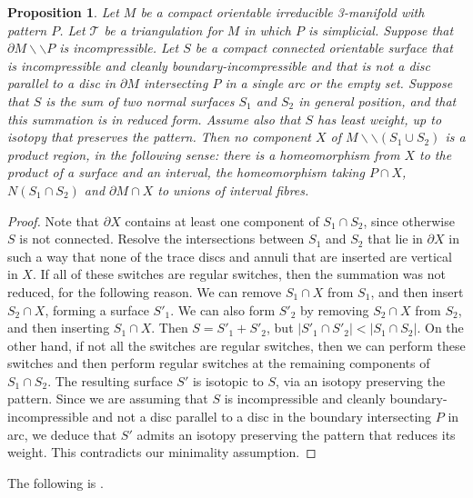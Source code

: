 \documentclass[oneside]{amsart}
\numberwithin{equation}{section}
\theoremstyle{plain}
\newtheorem{proposition}[equation]{Proposition}
\theoremstyle{definition}
\newcommand{\cut}{\backslash\backslash}
\begin{document}
\begin{proposition} 
\label{Prop:NoProduct}
Let $M$ be a compact orientable irreducible 3-manifold with pattern $P$. Let $\mathcal{T}$ be
a triangulation for $M$ in which $P$ is simplicial. Suppose that $\partial M \cut P$ is incompressible.
Let $S$ be a compact connected orientable surface that is incompressible and cleanly boundary-incompressible
and that is not a disc parallel to a disc in $\partial M$ intersecting $P$ in a single arc  or the empty set.
Suppose that $S$ is the sum of two normal surfaces $S_1$ and $S_2$ in general position,
and that this summation is in reduced form. Assume also that $S$ has least weight, up to isotopy
that preserves the pattern. Then no component $X$ of $M \cut (S_1 \cup S_2)$ is a product region,
in the following sense: there is a homeomorphism from $X$ to the product of a surface and an interval,
the homeomorphism taking $P \cap X$, $N(S_1 \cap S_2)$ and $\partial M \cap X$ to unions of interval fibres.
\end{proposition}

\begin{proof}
Note that $\partial X$ contains at least one component of $S_1 \cap S_2$, since otherwise $S$ is not connected.
Resolve the intersections between $S_1$ and $S_2$ that lie in $\partial X$ in such a way that none of the trace discs and annuli that 
are inserted are vertical in $X$.
If all of these switches
are regular switches, then the summation was not reduced, for the following reason. We can remove
$S_1 \cap X$ from $S_1$, and then insert $S_2 \cap X$, forming a surface $S'_1$. We can
also form $S'_2$ by removing $S_2 \cap X$ from $S_2$, and then inserting $S_1 \cap X$.
Then $S = S'_1 + S'_2$, but $|S'_1 \cap S'_2| < |S_1 \cap S_2|$. On the other hand, 
if not all the switches are regular switches, then we can perform these switches and
then perform regular switches at the remaining components of $S_1 \cap S_2$.
The resulting surface $S'$ is isotopic to $S$, via an isotopy preserving the pattern.
Since we are assuming that $S$ is incompressible and cleanly boundary-incompressible
and not a disc parallel to a disc in the boundary intersecting $P$ in arc, we
deduce that $S'$ admits an isotopy preserving the pattern that reduces its weight.
This contradicts our minimality assumption.
\end{proof}

The following is \cite[Lemma 4.1.8]{Matveev}.
\end{document}

